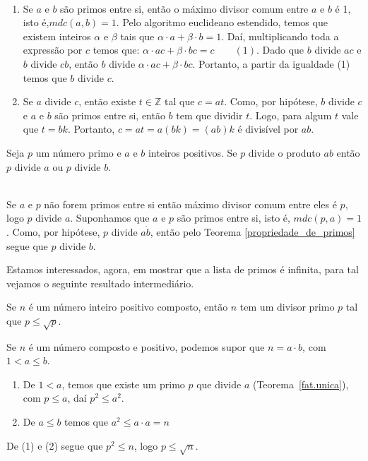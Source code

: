 \\
\begin{enumerate}
\item Se $a$ e $b$ s\~ao primos entre si, ent\~ao o m\'aximo divisor comum entre $a$ e $b$ \'e 1, isto \'e,$mdc(a,b)=1$. Pelo algoritmo euclideano estendido, temos que existem inteiros $\alpha$ e $\beta$ tais que $\alpha\cdot a+\beta\cdot b=1$. Da\'i, multiplicando toda a express\~ao por $c$ temos que: $\alpha\cdot ac+\beta\cdot bc=c\quad\quad (1)$. Dado que $b$ divide $ac$ e $b$ divide $cb$, ent\~ao $b$ divide $\alpha\cdot ac+\beta\cdot bc$. Portanto, a partir da igualdade (1) temos que $b$ divide $c$.

\item Se $a$ divide $c$, ent\~ao existe $t\in \mathbb{Z}$ tal que $c=at$. Como, por hip\'otese, $b$ divide $c$ e $a$ e $b$ s\~ao primos entre si, ent\~ao $b$ tem que dividir $t$. Logo, para algum $t$ vale que $t=bk$. Portanto, $c=at=a(bk)=(ab)k$ \'e divis\'ivel por $ab$.  	
\end{enumerate}	
\hfill\newline

\begin{Th}
Seja $p$ um n\'umero primo e $a$ e $b$ inteiros positivos. 
Se $p$ divide o produto $ab$ ent\~ao $p$ divide $a$ ou $p$ divide $b$. 
\end{Th}

\\
Se $a$ e $p$ n\~ao forem primos entre si ent\~ao m\'aximo divisor comum entre eles \'e $p$, logo $p$ divide $a$. Suponhamos que $a$ e $p$ s\~ao primos entre si, isto \'e, $mdc(p,a)=1$. Como, por hip\'otese, $p$ divide $a\dot b$, ent\~ao pelo Teorema \ref{propriedade_de_primos} segue que $p$ divide $b$.
\hfill\newline

Estamos interessados, agora, em mostrar que a lista de primos \'e infinita, para tal vejamos o seguinte resultado intermedi\'ario.

\begin{Th}\label{divisor_primo}
Se $n$ \'e um n\'umero inteiro positivo composto, ent\~ao $n$ tem um divisor primo
$p$ tal que $p\leq\sqrt{p}$.
\end{Th}

\newline
Se $n$ \'e um n\'umero composto e positivo, podemos supor que $n=a\cdot b$, com $1<a\leq b$.
\begin{enumerate}
\item De $1<a$, temos que existe um primo $p$ que divide $a$ (Teorema~\ref{fat.unica}), com $p\leq a$, da\'i $p^2\leq a^2$.
\item De $a\leq b$ temos que $a^2\leq a\cdot a=n$
\end{enumerate}
De (1) e (2) segue que $p^2\leq n$, logo $p\leq\sqrt{n}$.
\hfill \newline

